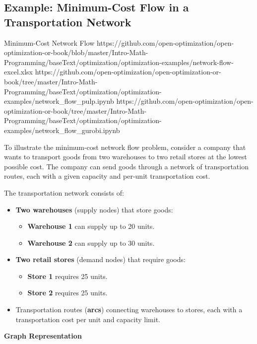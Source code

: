 \subsection{Example: Minimum-Cost Flow in a Transportation Network}

\begin{examplewithallcode}{Minimum-Cost Network Flow}
{https://github.com/open-optimization/open-optimization-or-book/blob/master/Intro-Math-Programming/baseText/optimization/optimization-examples/network-flow-excel.xlsx}
{https://github.com/open-optimization/open-optimization-or-book/tree/master/Intro-Math-Programming/baseText/optimization/optimization-examples/network_flow_pulp.ipynb}
{https://github.com/open-optimization/open-optimization-or-book/tree/master/Intro-Math-Programming/baseText/optimization/optimization-examples/network_flow_gurobi.ipynb}
\label{ex:min-cost-flow-warehouses}

To illustrate the minimum-cost network flow problem, consider a company that wants to transport goods from two warehouses to two retail stores at the lowest possible cost. The company can send goods through a network of transportation routes, each with a given capacity and per-unit transportation cost.

The transportation network consists of:
\begin{itemize}
    \item \textbf{Two warehouses} (supply nodes) that store goods: 
          \begin{itemize}
              \item \textbf{Warehouse 1} can supply up to 20 units.
              \item \textbf{Warehouse 2} can supply up to 30 units.
          \end{itemize}
    \item \textbf{Two retail stores} (demand nodes) that require goods:
          \begin{itemize}
              \item \textbf{Store 1} requires 25 units.
              \item \textbf{Store 2} requires 25 units.
          \end{itemize}
    \item Transportation routes (\textbf{arcs}) connecting warehouses to stores, each with a transportation cost per unit and capacity limit.
\end{itemize}

\textbf{Graph Representation}


\end{examplewithallcode}
